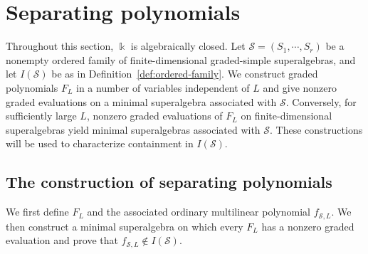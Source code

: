\documentclass[11pt,reqno]{amsart}
\newcommand{\kk}{\Bbbk}
\theoremstyle{definition}
\theoremstyle{remark}
\numberwithin{equation}{section}
\begin{document}
\section{Separating polynomials}\label{sec:separation}

Throughout this section, $\kk$ is algebraically closed. Let
$\mathcal S=(S_1,\cdots,S_r)$ be a nonempty ordered family of
finite-dimensional graded-simple superalgebras, and let $I(\mathcal S)$
be as in Definition~\ref{def:ordered-family}.
We construct graded polynomials $F_L$ in a number of variables
independent of $L$ and give nonzero graded evaluations on a minimal
superalgebra associated with $\mathcal S$.
Conversely, for sufficiently large $L$, nonzero graded evaluations
of $F_L$ on finite-dimensional superalgebras yield minimal
superalgebras associated with $\mathcal S$.
These constructions will be used to characterize containment
in $I(\mathcal S)$.



\subsection{The construction of separating polynomials}\label{subsec:separating-construction}

We first define $F_L$ and the associated ordinary multilinear
polynomial $f_{\mathcal S,L}$. We then construct a minimal superalgebra
on which every $F_L$ has a nonzero graded evaluation and prove that
$f_{\mathcal S,L}\notin I(\mathcal S)$.
\end{document}
